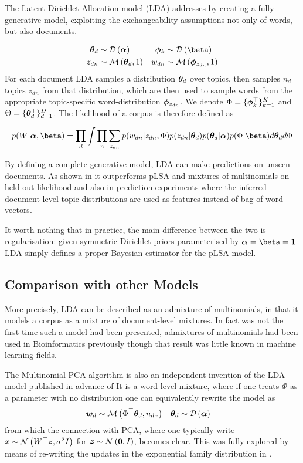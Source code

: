 The Latent Dirichlet Allocation model\cite{BleiNgJordan2003} (LDA) addresses by creating a fully generative model, exploiting the exchangeability assumptions not only of words, but also documents.

\begin{align}
\thd & \sim \dir{\vv{\alpha}} & \pk & \sim \dir{\vv{\beta}} \\
z_{dn} & \sim \muln{\thd}{1} & w_{dn} & \sim \muln{\vv{\phi}_{z_{dn}}}{1}
\end{align}
For each document LDA samples a distribution ${ \bm \theta_d }$ over topics, then samples $n_{d\cdot\cdot}$ topics $z_{dn}$ from that distribution, which are then used to sample words from the appropriate topic-specific word-distribution $\bm \phi_{z_{dn}}$. We denote $\Phi = \{ \bm \phi_k^\top \}_{k=1}^K$ and $\Theta = \{ \bm \theta_d^\top \}_{d=1}^D$. The likelihood of a corpus is therefore defined as

\begin{align}
p(W | \vv{\alpha}, \vv{\beta}) = \prod_d \int \prod_n \sum_{z_{dn}} p(w_{dn}|z_{dn}, \Phi)p(z_{dn}|\thd)p(\thd|\vv{\alpha})p(\Phi|\vv{\beta}) d\thd d\Phi
\end{align}

By defining a complete generative model, LDA can make predictions on unseen documents. As shown in \cite{BleiNgJordan2003} it outperforms pLSA and mixtures of multinomials on held-out likelihood and also in prediction experiments where the inferred document-level topic distributions are used as features instead of bag-of-word vectors.

It worth nothing that in practice, the main difference between the two is regularisation: given symmetric Dirichlet priors parameterised by $\vv{\alpha} = \vv{\beta} = \vv{1}$ LDA simply defines a proper Bayesian estimator for the pLSA model\cite{GiKa2003}.

\subsection{Comparison with other Models}
More precisely, LDA can be described as an admixture of multinomials, in that it models a corpus as a mixture of document-level mixtures. In fact \cite{BleiNgJordan2003} was not the first time such a model had been presented,  admixtures of multinomials had been used in Bioinformatics previously\cite{Pritchard2000} though that result was little known in machine learning fields. 

The Multinomial PCA algorithm\cite{Buntine2002} is also an independent invention of the LDA model published in advance of \cite{BleiNgJordan2003} It is a word-level mixture, where if one treats $\Phi$ as a parameter with no distribution one can equivalently rewrite the model as
\begin{align}
{  \bm w _d } & \sim \mathcal{M} \left( {\Phi^\top{  \bm \theta _d }},{n_{d\cdot\cdot}} \right) & { \bm \theta_d } & \sim \mathcal{D} \left( {\bm \alpha} \right)
\end{align}
from which the connection with PCA, where one typically write $x \sim \mathcal{N} \left( {W^\top\bm z}, {\sigma^2 I} \right)$ for $\bm z \sim \mathcal{N} \left( {\bm 0}, {I} \right)$, becomes clear. This was fully explored by means of re-writing the updates in the exponential family distribution in \cite{Buntine2002}.

